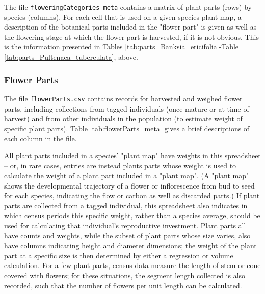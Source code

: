 \documentclass[10pt,twoside]{article}\usepackage[]{graphicx}\usepackage[]{color}
\begin{document}
The file \texttt{floweringCategories\_meta} contains a matrix of plant parts (rows) by species (columns). For each cell that is used on a given species plant map, a description of the botanical parts included in the "flower part" is given as well as the flowering stage at which the flower part is harvested, if it is not obvious.  This is the information presented in Tables \ref{tab:parts_Banksia_ericifolia}-Table \ref{tab:parts_Pultenaea_tuberculata}, above.

\subsubsection{Flower Parts}
The file \texttt{flowerParts.csv} contains records for harvested and weighed flower parts, including collections from tagged individuals (once mature or at time of harvest) and from other individuals in the population (to estimate weight of specific plant parts).  Table \ref{tab:flowerParts_meta} gives a brief descriptions of each column in the file.

All plant parts included in a species' "plant map" have weights in this spreadsheet -- or, in rare cases, entries are instead plants parts whose weight is used to calculate the weight of a plant part included in a "plant map". (A "plant map" shows the developmental trajectory of a flower or inflorescence from bud to seed for each species, indicating the flow or carbon as well as discarded parts.) If plant parts are collected from a tagged individual, this spreadsheet also indicates in which census periods this specific weight, rather than a species average, should be used for calculating that individual's reproductive investment. Plant parts all have counts and weights, while the subset of plant parts whose size varies, also have columns indicating height and diameter dimensions; the weight of the plant part at a specific size is then determined by either a regression or volume calculation. For a few plant parts, census data measure the length of stem or cone covered with flowers; for these situations, the segment length collected is also recorded, such that the number of flowers per unit length can be calculated.
\end{document}
